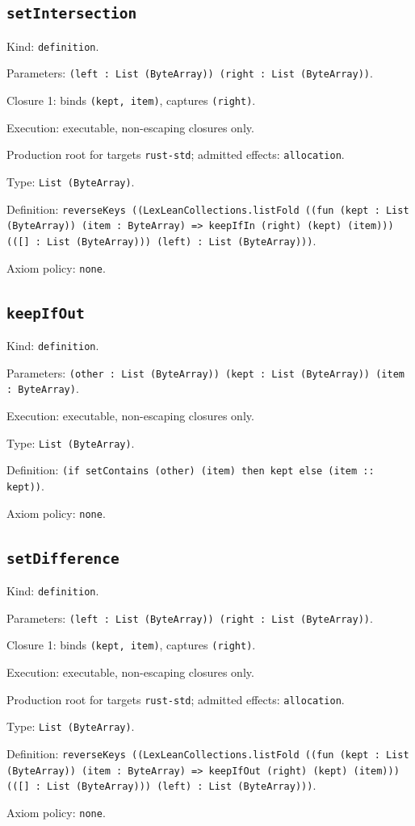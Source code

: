 \documentclass[11pt]{article}
\begin{document}
\subsection*{\texttt{setIntersection}}
\noindent Kind: \texttt{definition}.\par
\noindent Parameters: \texttt{(left : List (ByteArray)) (right : List (ByteArray))}.\par
\noindent Closure 1: binds \texttt{(kept, item)}, captures \texttt{(right)}.\par
\noindent Execution: executable, non-escaping closures only.\par
\noindent Production root for targets \texttt{rust-std}; admitted effects: \texttt{allocation}.\par
\noindent Type: \texttt{List (ByteArray)}.\par
\noindent Definition: \texttt{reverseKeys ((LexLeanCollections.listFold ((fun (kept : List (ByteArray)) (item : ByteArray) => keepIfIn (right) (kept) (item))) (([] : List (ByteArray))) (left) : List (ByteArray)))}.\par
\noindent Axiom policy: \texttt{none}.\par
\subsection*{\texttt{keepIfOut}}
\noindent Kind: \texttt{definition}.\par
\noindent Parameters: \texttt{(other : List (ByteArray)) (kept : List (ByteArray)) (item : ByteArray)}.\par
\noindent Execution: executable, non-escaping closures only.\par
\noindent Type: \texttt{List (ByteArray)}.\par
\noindent Definition: \texttt{(if setContains (other) (item) then kept else (item :: kept))}.\par
\noindent Axiom policy: \texttt{none}.\par
\subsection*{\texttt{setDifference}}
\noindent Kind: \texttt{definition}.\par
\noindent Parameters: \texttt{(left : List (ByteArray)) (right : List (ByteArray))}.\par
\noindent Closure 1: binds \texttt{(kept, item)}, captures \texttt{(right)}.\par
\noindent Execution: executable, non-escaping closures only.\par
\noindent Production root for targets \texttt{rust-std}; admitted effects: \texttt{allocation}.\par
\noindent Type: \texttt{List (ByteArray)}.\par
\noindent Definition: \texttt{reverseKeys ((LexLeanCollections.listFold ((fun (kept : List (ByteArray)) (item : ByteArray) => keepIfOut (right) (kept) (item))) (([] : List (ByteArray))) (left) : List (ByteArray)))}.\par
\noindent Axiom policy: \texttt{none}.\par
\end{document}
